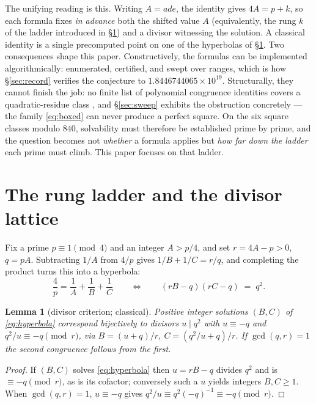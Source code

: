 \documentclass[11pt]{article}
\newtheorem{lemma}[theorem]{Lemma}
\theoremstyle{definition}
\theoremstyle{remark}
\begin{document}
The unifying reading is this. Writing $A = ade$, the identity gives $4A = p + k$, so
each formula fixes \emph{in advance} both the shifted value $A$ (equivalently, the
rung $k$ of the ladder introduced in \S\ref{sec:ladder}) and a divisor witnessing the
solution. A classical identity is a single precomputed point on one of the hyperbolas
of \S\ref{sec:ladder}. Two consequences shape this paper. Constructively, the
formulas can be implemented algorithmically: enumerated, certified, and swept over ranges, which
is how \S\ref{sec:record} verifies the conjecture to $1.8446744065\times10^{19}$.
Structurally, they cannot finish the job: no finite list of polynomial congruence
identities covers a quadratic-residue class \cite{Schinzel2000,Yamamoto1965}, and
\S\ref{sec:sweep} exhibits the obstruction concretely --- the family
\eqref{eq:boxed} can never produce a perfect square. On the six square classes
modulo $840$, solvability must therefore be established prime by prime, and the
question becomes not \emph{whether} a formula applies but \emph{how far down the
ladder} each prime must climb. This paper focuses on that ladder.

\section{The rung ladder and the divisor lattice}\label{sec:ladder}

Fix a prime $p \equiv 1 \pmod 4$ and an integer $A > p/4$, and set
$r = 4A - p > 0$, $q = pA$. Subtracting $1/A$ from $4/p$ gives $1/B + 1/C = r/q$, and
completing the product turns this into a hyperbola:
\begin{equation}\label{eq:hyperbola}
\frac{4}{p} = \frac{1}{A} + \frac{1}{B} + \frac{1}{C}
\qquad\Longleftrightarrow\qquad
(rB - q)(rC - q) \;=\; q^2 .
\end{equation}

\begin{lemma}[divisor criterion; classical]\label{lem:divisor}
Positive integer solutions $(B, C)$ of \eqref{eq:hyperbola} correspond bijectively to
divisors $u \mid q^2$ with $u \equiv -q$ and $q^2/u \equiv -q \pmod r$, via
$B = (u+q)/r$, $C = (q^2/u + q)/r$. If $\gcd(q, r) = 1$ the second congruence follows
from the first.
\end{lemma}

\begin{proof}
If $(B,C)$ solves \eqref{eq:hyperbola} then $u = rB - q$ divides $q^2$ and is
$\equiv -q \pmod r$, as is its cofactor; conversely such a $u$ yields integers
$B, C \ge 1$. When $\gcd(q,r)=1$, $u \equiv -q$ gives
$q^2/u \equiv q^2(-q)^{-1} \equiv -q \pmod r$.
\end{proof}
\end{document}
